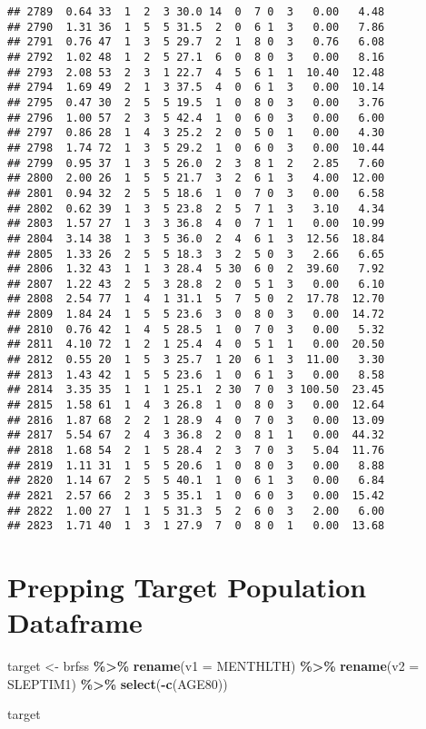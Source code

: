 \documentclass[
]{article}
\newenvironment{Shaded}{\begin{snugshade}}{\end{snugshade}}
\newcommand{\AttributeTok}[1]{\textcolor[rgb]{0.13,0.29,0.53}{#1}}
\newcommand{\FunctionTok}[1]{\textcolor[rgb]{0.13,0.29,0.53}{\textbf{#1}}}
\newcommand{\NormalTok}[1]{#1}
\newcommand{\OtherTok}[1]{\textcolor[rgb]{0.56,0.35,0.01}{#1}}
\newcommand{\SpecialCharTok}[1]{\textcolor[rgb]{0.81,0.36,0.00}{\textbf{#1}}}
\begin{document}
\begin{verbatim}
## 2789  0.64 33  1  2  3 30.0 14  0  7 0  3   0.00   4.48
## 2790  1.31 36  1  5  5 31.5  2  0  6 1  3   0.00   7.86
## 2791  0.76 47  1  3  5 29.7  2  1  8 0  3   0.76   6.08
## 2792  1.02 48  1  2  5 27.1  6  0  8 0  3   0.00   8.16
## 2793  2.08 53  2  3  1 22.7  4  5  6 1  1  10.40  12.48
## 2794  1.69 49  2  1  3 37.5  4  0  6 1  3   0.00  10.14
## 2795  0.47 30  2  5  5 19.5  1  0  8 0  3   0.00   3.76
## 2796  1.00 57  2  3  5 42.4  1  0  6 0  3   0.00   6.00
## 2797  0.86 28  1  4  3 25.2  2  0  5 0  1   0.00   4.30
## 2798  1.74 72  1  3  5 29.2  1  0  6 0  3   0.00  10.44
## 2799  0.95 37  1  3  5 26.0  2  3  8 1  2   2.85   7.60
## 2800  2.00 26  1  5  5 21.7  3  2  6 1  3   4.00  12.00
## 2801  0.94 32  2  5  5 18.6  1  0  7 0  3   0.00   6.58
## 2802  0.62 39  1  3  5 23.8  2  5  7 1  3   3.10   4.34
## 2803  1.57 27  1  3  3 36.8  4  0  7 1  1   0.00  10.99
## 2804  3.14 38  1  3  5 36.0  2  4  6 1  3  12.56  18.84
## 2805  1.33 26  2  5  5 18.3  3  2  5 0  3   2.66   6.65
## 2806  1.32 43  1  1  3 28.4  5 30  6 0  2  39.60   7.92
## 2807  1.22 43  2  5  3 28.8  2  0  5 1  3   0.00   6.10
## 2808  2.54 77  1  4  1 31.1  5  7  5 0  2  17.78  12.70
## 2809  1.84 24  1  5  5 23.6  3  0  8 0  3   0.00  14.72
## 2810  0.76 42  1  4  5 28.5  1  0  7 0  3   0.00   5.32
## 2811  4.10 72  1  2  1 25.4  4  0  5 1  1   0.00  20.50
## 2812  0.55 20  1  5  3 25.7  1 20  6 1  3  11.00   3.30
## 2813  1.43 42  1  5  5 23.6  1  0  6 1  3   0.00   8.58
## 2814  3.35 35  1  1  1 25.1  2 30  7 0  3 100.50  23.45
## 2815  1.58 61  1  4  3 26.8  1  0  8 0  3   0.00  12.64
## 2816  1.87 68  2  2  1 28.9  4  0  7 0  3   0.00  13.09
## 2817  5.54 67  2  4  3 36.8  2  0  8 1  1   0.00  44.32
## 2818  1.68 54  2  1  5 28.4  2  3  7 0  3   5.04  11.76
## 2819  1.11 31  1  5  5 20.6  1  0  8 0  3   0.00   8.88
## 2820  1.14 67  2  5  5 40.1  1  0  6 1  3   0.00   6.84
## 2821  2.57 66  2  3  5 35.1  1  0  6 0  3   0.00  15.42
## 2822  1.00 27  1  1  5 31.3  5  2  6 0  3   2.00   6.00
## 2823  1.71 40  1  3  1 27.9  7  0  8 0  1   0.00  13.68
\end{verbatim}

\section{Prepping Target Population
Dataframe}\label{prepping-target-population-dataframe}

\begin{Shaded}
\begin{Highlighting}[]
\NormalTok{target }\OtherTok{\textless{}{-}}\NormalTok{ brfss }\SpecialCharTok{\%\textgreater{}\%} 
  \FunctionTok{rename}\NormalTok{(}\AttributeTok{v1 =}\NormalTok{ MENTHLTH) }\SpecialCharTok{\%\textgreater{}\%} 
  \FunctionTok{rename}\NormalTok{(}\AttributeTok{v2 =}\NormalTok{ SLEPTIM1) }\SpecialCharTok{\%\textgreater{}\%} 
  \FunctionTok{select}\NormalTok{(}\SpecialCharTok{{-}}\FunctionTok{c}\NormalTok{(AGE80))}
            
\NormalTok{target}
\end{Highlighting}
\end{Shaded}
\end{document}
